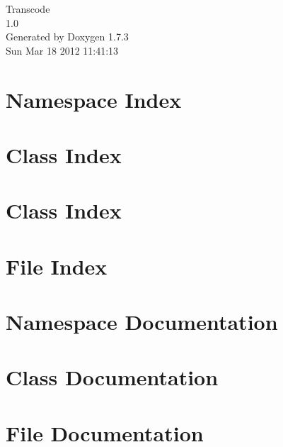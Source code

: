 \documentclass[a4paper]{book}
\begin{document}
\hypersetup{pageanchor=false}
\begin{titlepage}
\vspace*{7cm}
\begin{center}
{\Large Transcode \\[1ex]\large 1.0 }\\
\vspace*{1cm}
{\large Generated by Doxygen 1.7.3}\\
\vspace*{0.5cm}
{\small Sun Mar 18 2012 11:41:13}\\
\end{center}
\end{titlepage}
\clearemptydoublepage
{}
\tableofcontents
\clearemptydoublepage
{}
\hypersetup{pageanchor=true}
\chapter{Namespace Index}

\chapter{Class Index}

\chapter{Class Index}

\chapter{File Index}

\chapter{Namespace Documentation}




\chapter{Class Documentation}












\chapter{File Documentation}






\printindex
\end{document}
